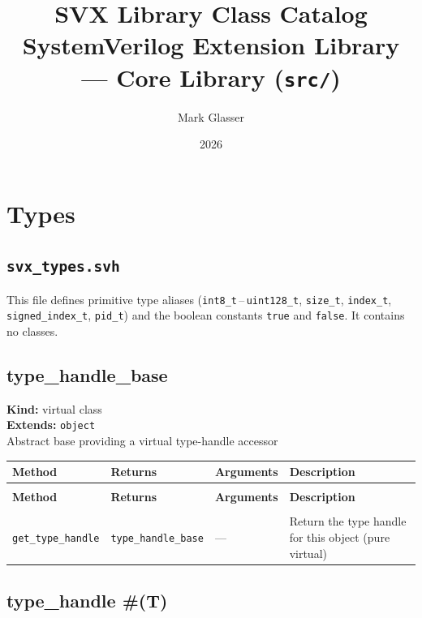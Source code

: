 \documentclass[11pt,letterpaper]{report}
\title{\textbf{SVX Library Class Catalog}\\[0.5em]
       \large SystemVerilog Extension Library --- Core Library (\texttt{src/})}
\author{Mark Glasser}
\date{2026}
\begin{document}
\maketitle
\tableofcontents

\chapter{Types}

\section*{\texttt{svx\_types.svh}}

\noindent This file defines primitive type aliases (\texttt{int8\_t}\,--\,\texttt{uint128\_t}, \texttt{size\_t}, \texttt{index\_t}, \texttt{signed\_index\_t}, \texttt{pid\_t}) and the boolean constants \texttt{true} and \texttt{false}. It contains no classes.

\section{type\_handle\_base}
\label{cls:typehandlebase}

\noindent\textbf{Kind:} virtual class\\
\noindent\textbf{Extends:} \texttt{object}\\
\noindent Abstract base providing a virtual type-handle accessor

\begin{xltabular}{\linewidth}{>{\small}p{1.35in} >{\small}p{1.25in} >{\small}p{0.95in} >{\small}X}
\toprule
\textbf{Method} & \textbf{Returns} & \textbf{Arguments} & \textbf{Description} \\
\midrule
\endfirsthead
{} \\
\midrule
\textbf{Method} & \textbf{Returns} & \textbf{Arguments} & \textbf{Description} \\
\midrule
\endhead
\midrule
{} \\
\endfoot
\bottomrule
\endlastfoot
\texttt{get\_type\_handle} & \texttt{type\_handle\_base} & --- & Return the type handle for this object (pure virtual) \\
\end{xltabular}

\section{type\_handle \#(T)}
\label{cls:typehandleT}
\end{document}
